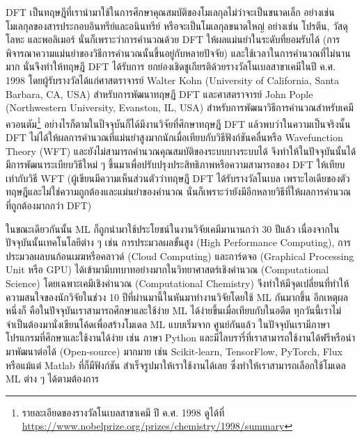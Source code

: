 DFT เป็นทฤษฎีที่เรานำมาใช้ในการศึกษาคุณสมบัติของโมเลกุลไม่ว่าจะเป็นขนาดเล็ก อย่างเช่น โมเลกุลของสารประกอบอินทรีย์และอนินทรีย์ 
หรือจะเป็นโมเลกุลขนาดใหญ่ อย่างเช่น โปรตีน, วัสดุโลหะ และพอลิเมอร์ นั่นก็เพราะว่าการคำนวณด้วย DFT ให้ผลแม่นยำในระดับที่ยอมรับได้ 
(การพิจารณาความแม่นยำของวิธีการคำนวณนั้นขึ้นอยู่กับหลายปัจจัย) และใช้เวลาในการคำนวณที่ไม่นานมาก นั่นจึงทำให้ทฤษฎี DFT ได้รับการ%
ยกย่องเชิดชูเกียรติด้วยรางวัลโนเบลสาขาเคมีในปี ค.ศ. 1998 โดยผู้รับรางวัลได้แก่ศาสตราจารย์ Walter Kohn (University of California, 
Santa Barbara, CA, USA) สำหรับการพัฒนาทฤษฎี DFT และศาสตราจารย์ John Pople (Northwestern University, Evanston, IL, 
USA) สำหรับการพัฒนาวิธีการคำนวณสำหรับเคมีควอนตัม\footnote{รายละเอียดของรางวัลโนเบลสาขาเคมี ปี ค.ศ. 1998 ดูได้ที่ 
\url{https://www.nobelprize.org/prizes/chemistry/1998/summary}} อย่างไรก็ตามในปัจจุบันก็ได้มีงานวิจัยที่ศึกษาทฤษฎี DFT 
แล้วพบว่าในความเป็นจริงนั้น DFT ไม่ได้ให้ผลการคำนวณที่แม่นยำสูงมากนักเมื่อเทียบกับวิธีฟังก์ชันคลื่นหรือ Wavefunction Theory (WFT)%
\autocite{korth2017,janesko2021} และยังไม่สามารถคำนวณคุณสมบัติของระบบบางระบบได้ จึงทำให้ในปัจจุบันนั้นได้มีการพัฒนาระเบียบวิธีใหม่ ๆ 
ขึ้นมาเพื่อปรับปรุงประสิทธิภาพหรือความสามารถของ DFT ให้เทียบเท่ากับวิธี WFT (ผู้เขียนมีความเห็นส่วนตัวว่าทฤษฎี DFT ได้รับรางวัลโนเบล%
เพราะไอเดียของตัวทฤษฎีและไม่ใช่ความถูกต้องและแม่นยำของคำนวณ นั่นก็เพราะว่ายังมีอีกหลายวิธีที่ให้ผลการคำนวณที่ถูกต้องมากกว่า DFT)

ในขณะเดียวกันนั้น ML ก็ถูกนำมาใช้ประโยชน์ในงานวิจัยเคมีมานานกว่า 30 ปีแล้ว เนื่องจากในปัจจุบันนั้นเทคโนโลยีต่าง ๆ เช่น การประมวลผลขั้นสูง 
(High Performance Computing), การประมวลผลบนก้อนเมฆหรือคลาวด์ (Cloud Computing) และการ์ดจอ (Graphical Processing Unit 
หรือ GPU) ได้เข้ามามีบทบาทอย่างมากในวิทยาศาสตร์เชิงคำนวณ (Computational Science) โดยเฉพาะเคมีเชิงคำนวณ (Computational 
Chemistry) จึงทำให้มีจุดเปลี่ยนที่ทำให้ความสนใจของนักวิจัยในช่วง 10 ปีที่ผ่านมานี้ในหันมาทำงานวิจัยโดยใช้ ML กันมากขึ้น อีกเหตุผลหนึ่งก็%
คือในปัจจุบันเราสามารถศึกษาและใช้ง่าย ML ได้ง่ายขึ้นเมื่อเทียบกับในอดีต ทุกวันนี้เราไม่จำเป็นต้องมานั่งเขียนโค้ดเพื่อสร้างโมเดล ML แบบเริ่มจาก%
ศูนย์กันแล้ว ในปัจจุบันเรามีภาษาโปรแกรมที่ศึกษาและใช้งานได้ง่าย เช่น ภาษา Python และมีไลบรารี่ที่เราสามารถใช้งานได้ฟรีหรือนำมาพัฒนาต่อได้ 
(Open-source) มากมาย เช่น Scikit-learn\autocite{scikit-learn}, TensorFlow\autocite{tensorflow2015-whitepaper}, 
PyTorch\autocite{NEURIPS2019_9015}, Flux\autocite{innes2018} หรือแม้แต่ Matlab\autocite{MATLAB:2010} ที่ก็มีฟังก์ชัน%
สำเร็จรูปมาให้เราใช้งานได้เลย ซึ่งทำให้เราสามารถเลือกใช้โมเดล ML ต่าง ๆ ได้ตามต้องการ

